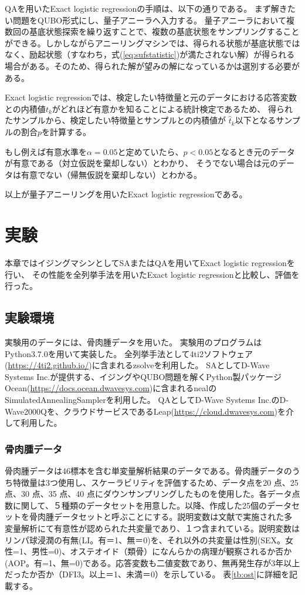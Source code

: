 \documentclass[12pt, dvipdfmx]{jmaster}
\theoremstyle{definition}
\begin{document}
QAを用いたExact logistic regressionの手順は、以下の通りである。
まず解きたい問題をQUBO形式にし、量子アニーラへ入力する。
量子アニーラにおいて複数回の基底状態探索を繰り返すことで、複数の基底状態をサンプリングすることができる。しかしながらアニーリングマシンでは、得られる状態が基底状態ではなく、励起状態（すなわち，式(\ref{eq:sufstatistic})が満たされない解）が得られる場合がある。そのため、得られた解が望みの解になっているかは選別する必要がある。

Exact logistic regressionでは、検定したい特徴量と元のデータにおける応答変数との内積値$t_k$がどれほど有意かを知ることによる統計検定であるため、
得られたサンプルから、検定したい特徴量とサンプルとの内積値が
$\hat{t}_k$以下となるサンプルの割合$p$を計算する。

もし例えば有意水準を$α=0.05$と定めていたら、$p < 0.05$となるとき元のデータが有意である（対立仮説を棄却しない）とわかり、
そうでない場合は元のデータは有意でない（帰無仮説を棄却しない）とわかる。

以上が量子アニーリングを用いたExact logistic regressionである。

\chapter{実験}
\label{sec:ex}
本章ではイジングマシンとしてSAまたはQAを用いてExact logistic regressionを行い、 その性能を全列挙手法を用いたExact logistic regressionと比較し、評価を行った。

\section{実験環境}
実験用のデータには、骨肉腫データを用いた\cite{jaffe1983osteosarcoma}。
実験用のプログラムはPython3.7.0を用いて実装した。 
全列挙手法として4ti2ソフトウェア(\url{https://4ti2.github.io/})に含まれるzsolveを利用した。
SAとしてD-Wave　Systems Inc.が提供する、イジングやQUBO問題を解くPython製パッケージOcean(\url{https://docs.ocean.dwavesys.com})に含まれるnealのSimulatedAnnealingSamplerを利用した。
QAとしてD-Wave Systems Inc.のD-Wave2000Qを、クラウドサービスであるLeap(\url{https://cloud.dwavesys.com})を介して利用した。

\subsection{骨肉腫データ}
\label{sec:ost}
骨肉腫データは46標本を含む単変量解析結果のデータである\cite{jaffe1983osteosarcoma}。骨肉腫データのうち特徴量は3つ使用し、スケーラビリティを評価するため、データ点を20 点、25 点、30 点、35 点、40 点にダウンサンプリングしたものを使用した。各データ点数に関して、５種類のデータセットを用意した。以降、作成した25個のデータセットを骨肉腫データセットと呼ぶことにする。説明変数は文献\cite{jaffe1983osteosarcoma}で実施された多変量解析にて有意性が認められた共変量であり、１つ含まれている。説明変数はリンパ球浸潤の有無(LI。有＝1、無＝0)を、それ以外の共変量は性別(SEX。女性=1、男性=0)、オステオイド（類骨）になんらかの病理が観察されるか否か(AOP。有=1、無=0)である。応答変数も二値変数であり、無再発生存が3年以上だったか否か（DFI3。以上＝1、未満＝0）を示している。
表\ref{tb:ost}に詳細を記載する。
\end{document}
